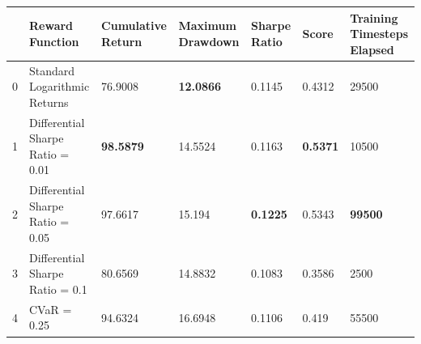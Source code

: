 \begin{tabular}{lllllll}
\toprule
 & Reward Function & Cumulative Return & Maximum Drawdown & Sharpe Ratio & Score & Training Timesteps Elapsed \\
\midrule
0 & Standard Logarithmic Returns & 76.9008 & \textbf{12.0866} & 0.1145 & 0.4312 & 29500 \\
1 & Differential Sharpe Ratio = 0.01 & \textbf{98.5879} & 14.5524 & 0.1163 & \textbf{0.5371} & 10500 \\
2 & Differential Sharpe Ratio = 0.05 & 97.6617 & 15.194 & \textbf{0.1225} & 0.5343 & \textbf{99500} \\
3 & Differential Sharpe Ratio = 0.1 & 80.6569 & 14.8832 & 0.1083 & 0.3586 & 2500 \\
4 & CVaR = 0.25 & 94.6324 & 16.6948 & 0.1106 & 0.419 & 55500 \\
\bottomrule
\end{tabular}
